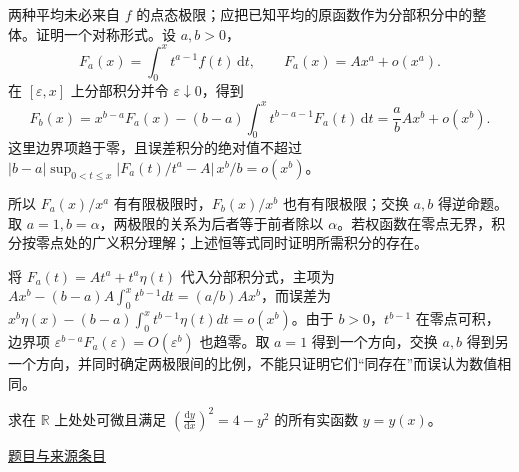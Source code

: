 \documentclass[UTF8,12pt,a4paper,fontset=fandol]{ctexart}
\begin{document}
\begin{solve}\label{ans:fin14-low:9}

两种平均未必来自 $f$ 的点态极限；应把已知平均的原函数作为分部积分中的整体。证明一个对称形式。设 $a,b>0$，
\[
F_a(x)=\int_0^xt^{a-1}f(t)\,\mathrm dt,
\qquad F_a(x)=Ax^a+o(x^a).
\]
在 $[\varepsilon,x]$ 上分部积分并令 $\varepsilon\downarrow0$，得到
\[
F_b(x)=x^{b-a}F_a(x)-(b-a)\int_0^xt^{b-a-1}F_a(t)\,\mathrm dt
=\frac abAx^b+o(x^b).
\]
这里边界项趋于零，且误差积分的绝对值不超过
$|b-a|\sup_{0<t\le x}|F_a(t)/t^a-A|\,x^b/b=o(x^b)$。

所以 $F_a(x)/x^a$ 有有限极限时，$F_b(x)/x^b$ 也有有限极限；交换 $a,b$ 得逆命题。取 $a=1,b=\alpha$，两极限的关系为后者等于前者除以 $\alpha$。若权函数在零点无界，积分按零点处的广义积分理解；上述恒等式同时证明所需积分的存在。

将 $F_a(t)=At^a+t^a\eta(t)$ 代入分部积分式，主项为 $Ax^b-(b-a)A\int_0^xt^{b-1}dt=(a/b)Ax^b$，而误差为 $x^b\eta(x)-(b-a)\int_0^xt^{b-1}\eta(t)dt=o(x^b)$。由于 $b>0$，$t^{b-1}$ 在零点可积，边界项 $\varepsilon^{b-a}F_a(\varepsilon)=O(\varepsilon^b)$ 也趋零。取 $a=1$ 得到一个方向，交换 $a,b$ 得到另一个方向，并同时确定两极限间的比例，不能只证明它们“同存在”而误认为数值相同。

\end{solve}

\begin{example}\label{ex:fin14-low:10}\label{pr:fin14-low:10}

求在 $\mathbb{R}$ 上处处可微且满足 $\left( \frac{\mathrm{d}y}{\mathrm{d}x} \right)^2 = 4 - y^2$ 的所有实函数 $y = y(x)$。

\par\href{https://github.com/lzxcr/cmc-mathematics/blob/64916fa1fdbc3e444a652eca204d5669058ee321/src/problems/finals/14/12.md}{题目与来源条目}

\end{example}
\end{document}

